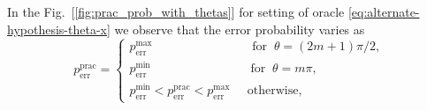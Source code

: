 \documentclass[%
 aps,
 jmp,%
 amsmath,amssymb,
 reprint,%
]{revtex4-2}
\begin{document}
In the Fig.~[\ref{fig:prac_prob_with_thetas}] for setting of oracle \eqref{eq:alternate-hypothesis-theta-x} we observe that the error probability varies as
\[
p_\textrm{err}^\textrm{prac} = 
\begin{cases}
p_\textrm{err}^\textrm{max}\;\;\;\;\;\;\;\;\;\;\;\;\;\;\;\;\;\;\;\;\;\;\;\;\;\;\;\;\; \textrm{for}\;\; \theta = (2m+1)\pi/2,\\

p_\textrm{err}^\textrm{min} \;\;\;\;\;\;\;\;\;\;\;\;\;\;\;\;\;\;\;\;\;\;\;\;\;\;\;\;\; \textrm{for}\;\; \theta = m\pi,\\

p_\textrm{err}^\textrm{min}<p_\textrm{err}^\textrm{prac} <p_\textrm{err}^\textrm{max}\;\;\;\;\; \textrm{otherwise},
\end{cases}
\]
\end{document}
